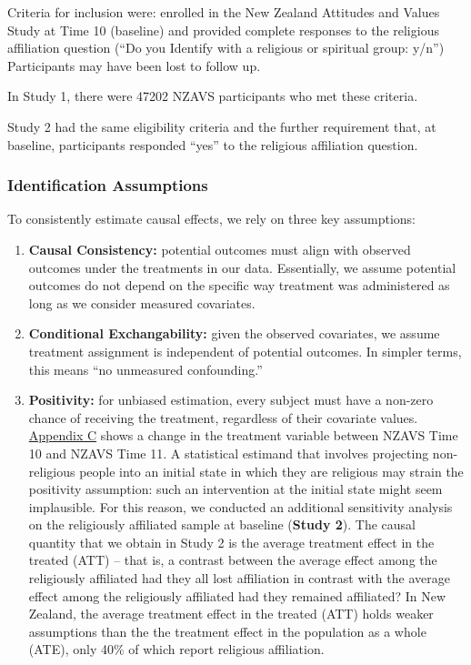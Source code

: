 \documentclass[
  singlecolumn]{article}
\begin{document}
Criteria for inclusion were: enrolled in the New Zealand Attitudes and
Values Study at Time 10 (baseline) and provided complete responses to
the religious affiliation question (``Do you Identify with a religious
or spiritual group: y/n'') Participants may have been lost to follow up.

In Study 1, there were 47202 NZAVS participants who met these criteria.

Study 2 had the same eligibility criteria and the further requirement
that, at baseline, participants responded ``yes'' to the religious
affiliation question.

\subsubsection{Identification
Assumptions}\label{identification-assumptions}

To consistently estimate causal effects, we rely on three key
assumptions:

\begin{enumerate}
\def\labelenumi{\arabic{enumi}.}
\item
  \textbf{Causal Consistency:} potential outcomes must align with
  observed outcomes under the treatments in our data. Essentially, we
  assume potential outcomes do not depend on the specific way treatment
  was administered as long as we consider measured covariates.
\item
  \textbf{Conditional Exchangability:} given the observed covariates, we
  assume treatment assignment is independent of potential outcomes. In
  simpler terms, this means ``no unmeasured confounding.''
\item
  \textbf{Positivity:} for unbiased estimation, every subject must have
  a non-zero chance of receiving the treatment, regardless of their
  covariate values. \hyperref[appendix-exposures]{Appendix C} shows a
  change in the treatment variable between NZAVS Time 10 and NZAVS Time
  11. A statistical estimand that involves projecting non-religious
  people into an initial state in which they are religious may strain
  the positivity assumption: such an intervention at the initial state
  might seem implausible. For this reason, we conducted an additional
  sensitivity analysis on the religiously affiliated sample at baseline
  (\textbf{Study 2}). The causal quantity that we obtain in Study 2 is
  the average treatment effect in the treated (ATT) -- that is, a
  contrast between the average effect among the religiously affiliated
  had they all lost affiliation in contrast with the average effect
  among the religiously affiliated had they remained affiliated? In New
  Zealand, the average treatment effect in the treated (ATT) holds
  weaker assumptions than the the treatment effect in the population as
  a whole (ATE), only 40\% of which report religious affiliation.
\end{enumerate}
\end{document}
